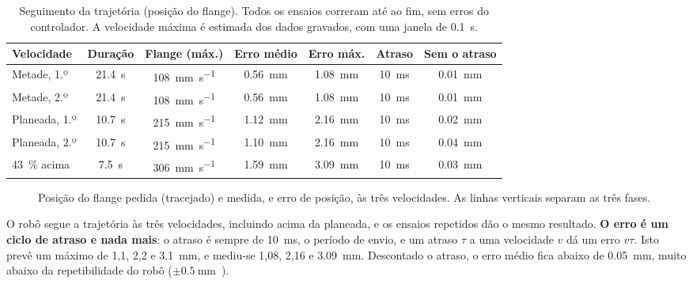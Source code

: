 \begin{table}[H]
\centering
\caption{Seguimento da trajetória (posição do flange). Todos os ensaios
correram até ao fim, sem erros do controlador. A velocidade máxima é estimada
dos dados gravados, com uma janela de \SI{0.1}{\second}.}
\label{tab:exec}
\small
\begin{tabular}{lcccccc}
\toprule
\rowcolor{tabcab}
Velocidade & Duração & Flange (máx.) & Erro médio & Erro máx. & Atraso & Sem o atraso \\
\midrule
Metade, 1.º   & \SI{21.4}{\second} & \SI{108}{\milli\meter\per\second} & \SI{0.56}{\milli\meter} & \SI{1.08}{\milli\meter} & \SI{10}{\milli\second} & \SI{0.01}{\milli\meter} \\
Metade, 2.º   & \SI{21.4}{\second} & \SI{108}{\milli\meter\per\second} & \SI{0.56}{\milli\meter} & \SI{1.08}{\milli\meter} & \SI{10}{\milli\second} & \SI{0.01}{\milli\meter} \\
Planeada, 1.º & \SI{10.7}{\second} & \SI{215}{\milli\meter\per\second} & \SI{1.12}{\milli\meter} & \SI{2.16}{\milli\meter} & \SI{10}{\milli\second} & \SI{0.02}{\milli\meter} \\
Planeada, 2.º & \SI{10.7}{\second} & \SI{215}{\milli\meter\per\second} & \SI{1.10}{\milli\meter} & \SI{2.16}{\milli\meter} & \SI{10}{\milli\second} & \SI{0.04}{\milli\meter} \\
\SI{43}{\percent} acima & \SI{7.5}{\second} & \SI{306}{\milli\meter\per\second} & \SI{1.59}{\milli\meter} & \SI{3.09}{\milli\meter} & \SI{10}{\milli\second} & \SI{0.03}{\milli\meter} \\
\bottomrule
\end{tabular}
\end{table}

\begin{figure}[H]
\centering
{}
\caption{Posição do flange pedida (tracejado) e medida, e erro de posição, às
três velocidades. As linhas verticais separam as três fases.}
\label{fig:exec}
\end{figure}

O robô segue a trajetória às três velocidades, incluindo acima da planeada, e
os ensaios repetidos dão o mesmo resultado. \textbf{O erro é um ciclo de
atraso e nada mais}: o atraso é sempre de \SI{10}{\milli\second}, o período
de envio, e um atraso $\tau$ a uma velocidade $v$ dá um erro $v\tau$. Isto
prevê um máximo de 1,1, 2,2 e \SI{3.1}{\milli\meter}, e mediu-se 1,08, 2,16 e
\SI{3.09}{\milli\meter}. Descontado o atraso, o erro médio fica abaixo de
\SI{0.05}{\milli\meter}, muito abaixo da repetibilidade do robô
($\pm\SI{0.5}{\milli\meter}$~\cite{ufactory_lite6}).

